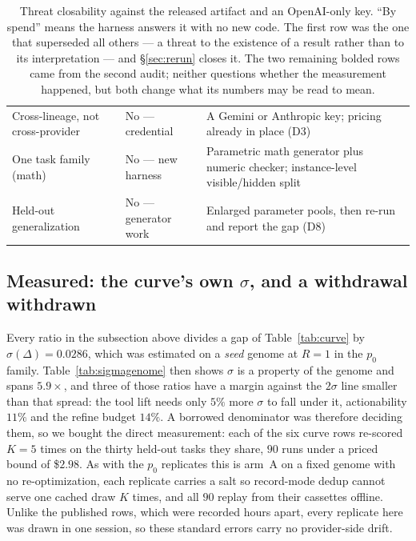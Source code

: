 \documentclass[11pt]{article}
\newcommand{\dd}{\ensuremath{\Delta}}
\begin{document}
\begin{table}[h]
\begin{tabular}{p{}p{}p{}}
Cross-lineage, not cross-provider & No --- credential & A Gemini or Anthropic key; pricing
  already in place (D3) \\
One task family (math) & No --- new harness & Parametric math generator plus numeric checker;
  instance-level visible/hidden split \\
Held-out generalization & No --- generator work & Enlarged parameter pools, then re-run and
  report the gap (D8) \\
\bottomrule
\end{tabular}
\caption{Threat closability against the released artifact and an OpenAI-only key. ``By
spend'' means the harness answers it with no new code. The first row was the one that
superseded all others --- a threat to the existence of a result rather than to its
interpretation --- and \S\ref{sec:rerun} closes it. The two remaining bolded rows came from
the second audit; neither questions whether the measurement happened, but both change what
its numbers may be read to mean.}
\label{tab:closability}
\end{table}

\subsection{Measured: the curve's own \texorpdfstring{$\sigma$}{sigma}, and a withdrawal withdrawn}
\label{sec:curverepeat}

Every ratio in the subsection above divides a gap of Table~\ref{tab:curve} by
$\sigma(\dd) = 0.0286$, which was estimated on a \emph{seed} genome at $R{=}1$ in the $p_0$ family.
Table~\ref{tab:sigmagenome} then shows $\sigma$ is a property of the genome and spans $5.9\times$,
and three of those ratios have a margin against the $2\sigma$ line smaller than that spread: the
tool lift needs only $5\%$ more $\sigma$ to fall under it, actionability $11\%$ and the refine
budget $14\%$. A borrowed denominator was therefore deciding them, so we bought the direct
measurement: each of the six curve rows re-scored $K=5$ times on the thirty held-out tasks they
share, $90$ runs under a priced bound of \$$2.98$. As with the $p_0$ replicates this is arm~A on a fixed genome with no
re-optimization, each replicate carries a salt so record-mode dedup cannot serve one cached draw
$K$ times, and all $90$ replay from their cassettes offline. Unlike the published rows, which were
recorded hours apart, every replicate here was drawn in one session, so these standard errors carry
no provider-side drift.
\end{document}
